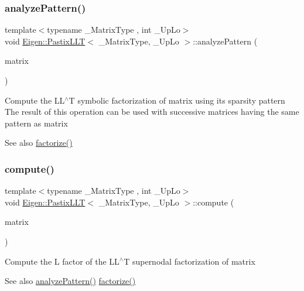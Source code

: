 \subsubsection{\texorpdfstring{analyzePattern()}{analyzePattern()}}
{\footnotesize\ttfamily template$<$typename \+\_\+\+Matrix\+Type , int \+\_\+\+Up\+Lo$>$ \\
void \mbox{\hyperlink{class_eigen_1_1_pastix_l_l_t}{Eigen\+::\+Pastix\+L\+LT}}$<$ \+\_\+\+Matrix\+Type, \+\_\+\+Up\+Lo $>$\+::analyze\+Pattern (\begin{DoxyParamCaption}\item[{const Matrix\+Type \&}]{matrix }\end{DoxyParamCaption})\hspace{0.3cm}{\ttfamily [inline]}}

Compute the L\+L$^\wedge$T symbolic factorization of {\ttfamily matrix} using its sparsity pattern The result of this operation can be used with successive matrices having the same pattern as {\ttfamily matrix} \begin{DoxySeeAlso}{See also}
\mbox{\hyperlink{class_eigen_1_1_pastix_l_l_t_a63dac317804b18a4704a519d7bdfaaff}{factorize()}} 
\end{DoxySeeAlso}
\mbox{\label{class_eigen_1_1_pastix_l_l_t_a54fcdef53903851e2d8113a6ed330b5c}} 
\subsubsection{\texorpdfstring{compute()}{compute()}}
{\footnotesize\ttfamily template$<$typename \+\_\+\+Matrix\+Type , int \+\_\+\+Up\+Lo$>$ \\
void \mbox{\hyperlink{class_eigen_1_1_pastix_l_l_t}{Eigen\+::\+Pastix\+L\+LT}}$<$ \+\_\+\+Matrix\+Type, \+\_\+\+Up\+Lo $>$\+::compute (\begin{DoxyParamCaption}\item[{const Matrix\+Type \&}]{matrix }\end{DoxyParamCaption})\hspace{0.3cm}{\ttfamily [inline]}}

Compute the L factor of the L\+L$^\wedge$T supernodal factorization of {\ttfamily matrix} \begin{DoxySeeAlso}{See also}
\mbox{\hyperlink{class_eigen_1_1_pastix_l_l_t_a671e8444ae2f04db3565e35caa958667}{analyze\+Pattern()}} \mbox{\hyperlink{class_eigen_1_1_pastix_l_l_t_a63dac317804b18a4704a519d7bdfaaff}{factorize()}} 
\end{DoxySeeAlso}
\mbox{\label{class_eigen_1_1_pastix_l_l_t_a63dac317804b18a4704a519d7bdfaaff}} 
